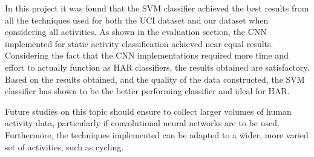 In this project it was found that the SVM classifier achieved the best results from all the techniques used for both the UCI dataset and our dataset when considering all activities.
As shown in the evaluation section, the CNN implemented for static activity classification achieved near equal results.
Considering the fact that the CNN implementations required more time and effort to actually function as HAR classifiers, the results obtained are satisfactory.
Based on the results obtained, and the quality of the data constructed, the SVM classifier has shown to be the better performing classifier and ideal for HAR.

Future studies on this topic should ensure to collect larger volumes of human activity data, particularly if convolutional neural networks are to be used. Furthermore,
the techniques implemented can be adapted to a wider, more varied set of activities, such as cycling.